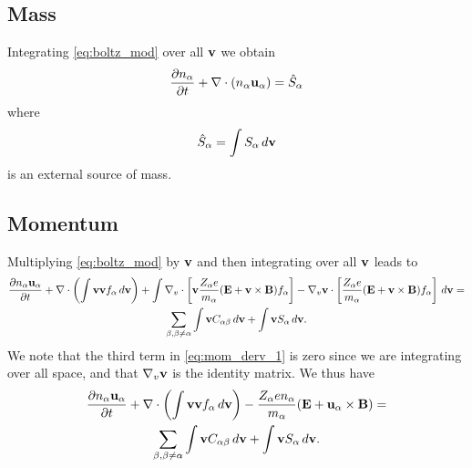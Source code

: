\documentclass[oneside,a4paper,11pt]{report}
\newcommand*\widefbox[1]{\fbox{\hspace{0.2em}#1\hspace{0.2em}}}
\begin{document}
\subsection{Mass}
Integrating \cref{eq:boltz_mod} over all $\mathbf{v}$ we obtain
\begin{equation}
\frac{\partial n_\alpha}{\partial t} + \nabla \cdot \left ( n_\alpha \mathbf{u}_\alpha \right ) = \hat{S}_\alpha
\end{equation}
where 
\begin{equation}
\hat{S}_\alpha = \int S_\alpha \, d\mathbf{v}
\end{equation}
is an external source of mass.

\subsection{Momentum}
Multiplying \cref{eq:boltz_mod} by $\mathbf{v}$ and then integrating over all $\mathbf{v}$ leads to
\begin{multline}
\label{eq:mom_derv_1}
\frac{\partial n_\alpha \mathbf{u}_\alpha}{\partial t} + \nabla \cdot \left ( \int \mathbf{v} \mathbf{v} f_\alpha \, d\mathbf{v} \right) + \int \nabla_v \cdot \left [ \mathbf{v} \frac{Z_\alpha e}{m_\alpha} ( \mathbf{E} + \mathbf{v} \times \mathbf{B} ) f_\alpha \right ] - \nabla_v \mathbf{v} \cdot \left [ \frac{Z_\alpha e}{m_\alpha} ( \mathbf{E} + \mathbf{v} \times \mathbf{B} ) f_\alpha \right ] \, d\mathbf{v} =\\
\sum_{\beta, \beta \ne \alpha} \int \mathbf{v} C_{\alpha \beta} \, d\mathbf{v} + \int \mathbf{v} S_\alpha \, d\mathbf{v}.
\end{multline}
We note that the third term in \cref{eq:mom_derv_1} is zero since we are integrating over all space, and that $\nabla_v \mathbf{v}$ is the identity matrix. We thus have
\begin{multline}
\label{eq:mom_derv_2}
\frac{\partial n_\alpha \mathbf{u}_\alpha}{\partial t} + \nabla \cdot \left ( \int \mathbf{v} \mathbf{v} f_\alpha \, d\mathbf{v} \right) - \frac{Z_\alpha e n_\alpha}{m_\alpha} ( \mathbf{E} + \mathbf{u}_\alpha \times \mathbf{B} ) =\\
\sum_{\beta, \beta \ne \alpha} \int \mathbf{v} C_{\alpha \beta} \, d\mathbf{v} + \int \mathbf{v} S_\alpha \, d\mathbf{v}.
\end{multline}
\end{document}
